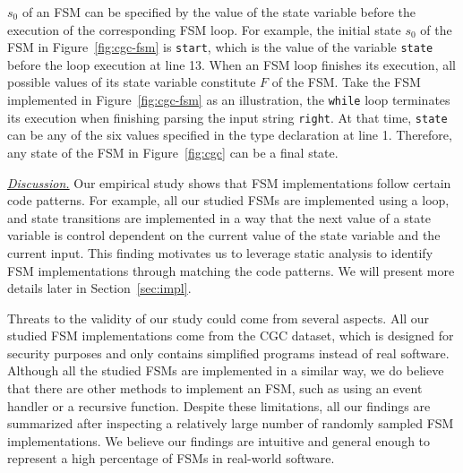 $s_0$ of an FSM can be specified
by the value of the state variable before the execution of the corresponding 
FSM loop.
For example, the initial state $s_0$ of the FSM in Figure~\ref{fig:cgc-fsm}
is \texttt{start}, which is the value of the variable \texttt{state}
before the loop execution at line 13.
When an FSM loop finishes its execution,
all possible values of its state variable
constitute $F$ of the FSM.
Take the FSM implemented in Figure~\ref{fig:cgc-fsm} as an illustration, 
the \texttt{while} loop terminates its execution when 
finishing parsing the input string \texttt{right}. 
At that time, \texttt{state} can be any of the six values specified
in the type declaration at line 1. 
Therefore, any state of the FSM in
Figure~\ref{fig:cgc} can be a final state.


\noindent\underline{{\textit{Discussion.}}}
Our empirical study shows that FSM implementations follow certain 
code patterns. For example, all our studied FSMs are implemented using a loop, 
and state transitions are implemented in a way that 
the next value of a state variable is control dependent 
on the current value of the state variable 
and the current input. 
This finding motivates us to leverage static analysis to 
identify FSM implementations 
through matching the code patterns. 
We will present more details later in Section~\ref{sec:impl}.

Threats to the validity of our study could come from several aspects. 
All our studied FSM implementations come from the CGC dataset,
which is designed for security purposes and only contains simplified programs 
instead of real software. 
Although all the studied FSMs are implemented in a similar way, 
we do believe that there are other methods to implement an FSM, 
such as using an event handler or a recursive function. 
Despite these limitations, all our findings are summarized 
after inspecting a relatively large number of randomly sampled FSM implementations. 
We believe our findings are intuitive and general enough to represent a high percentage 
of FSMs in real-world software. 










